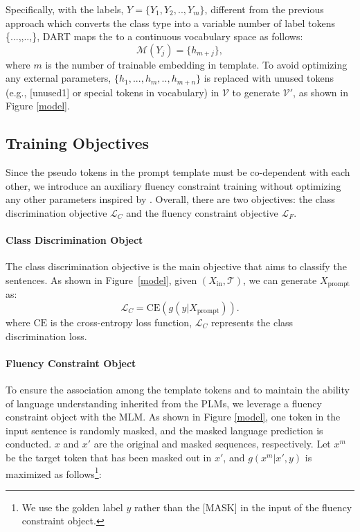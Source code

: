 \documentclass{article} \usepackage{iclr2022_conference,times}
\newcommand{\xinput}{{X}_{\mathrm{in}}}
\newcommand{\xprompt}{{X}_{\mathrm{prompt}}}
\newcommand{\template}{\mathcal{T}}
\newcommand{\vocabulary}{\mathcal{V}}
\newcommand{\vocabularyhat}{\mathcal{V'}}
\newcommand{\mapping}{\mathcal{M}}
\begin{document}
Specifically, with the labels,
$Y=\{Y_1,Y_2,..,Y_m\}$, different from the previous approach which converts the class type  into a variable number of label tokens \{...,,..,\}, DART maps the  to a continuous vocabulary space as follows:
\begin{equation}
    \mapping(\text{$Y_j$}) = \{h_{m+j}\},
\end{equation}
where $m$ is the number of trainable embedding in template.
To avoid optimizing any external parameters, $\{h_{1},...,h_{m},..,h_{m+n}\}$ is replaced with unused tokens (e.g., [unused1] or special tokens in vocabulary) in $\vocabulary$ to generate $\vocabularyhat$, as shown in Figure \ref{model}.

\subsection{Training Objectives}
\label{object}

Since the pseudo tokens in the prompt template must be co-dependent with each other, we introduce an auxiliary fluency constraint training without optimizing any other parameters inspired by  \cite{DBLP:journals/corr/abs-2103-10385,DBLP:journals/corr/abs-2103-11955}.
Overall, there are two objectives: the class discrimination objective $\mathcal{L}_{C}$ and the fluency constraint objective $\mathcal{L}_{F}$.

\paragraph{Class Discrimination Object} 
The class discrimination objective is the main objective that aims to classify the sentences.
As shown in Figure~\ref{model}, given $(\xinput, \template)$, we can generate $\xprompt$ as: 
\begin{equation}
    \mathcal{L}_{C}=\mathrm{CE}(g(y | \xprompt)).
\end{equation}
where $\mathrm{CE}$ is the cross-entropy loss function,  $\mathcal{L}_{C}$ represents the class discrimination loss.

\paragraph{Fluency Constraint Object}
 
To ensure the association among the template tokens and to maintain the ability of language understanding inherited from the PLMs, we leverage a fluency constraint object with the MLM. 
As shown in Figure \ref{model}, one token in the input sentence is randomly masked, and the masked language prediction is conducted.
$x$ and $x'$ are the original and masked sequences, respectively. 
Let $x^m$ be the target token that has been masked out in $x'$, and $g(x^m|x', y)$ is maximized as follows\footnote{We use the golden label $y$ rather than the [MASK] in the input of the fluency constraint object.}:
 
\end{document}

